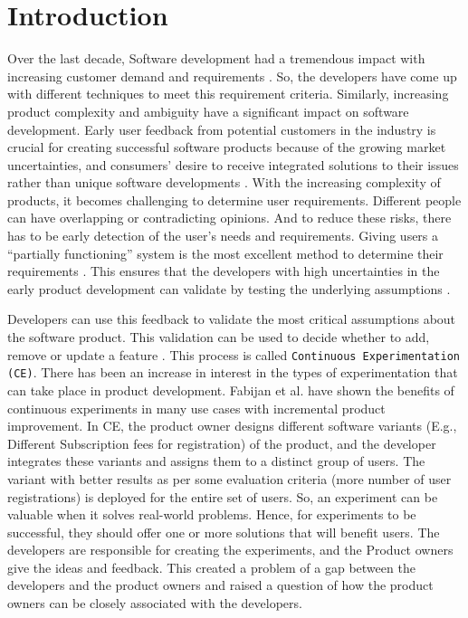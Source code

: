\chapter{Introduction} \label{chap:intro}

Over the last decade, Software development had a tremendous impact with increasing customer demand and requirements \cite{article:swdemand:ahmed}. 
So, the developers have come up with different techniques to meet this requirement criteria. 
Similarly, increasing product complexity and ambiguity have a significant impact on software development. 
Early user feedback from potential customers in the industry is crucial for creating successful software products because of the growing market uncertainties, and consumers' desire to receive integrated solutions to their issues rather than unique software developments \cite{misc:businessmodels:teece}.
With the increasing complexity of products, it becomes challenging to determine user requirements.
Different people can have overlapping or contradicting opinions. 
And to reduce these risks, there has to be early detection of the user's needs and requirements. 
Giving users a ``partially functioning'' system is the most excellent method to determine their requirements \cite{journal:prototyping:davis}.
This ensures that the developers with high uncertainties in the early product development can validate by testing the underlying assumptions \cite{misc:lean:steve}.

Developers can use this feedback to validate the most critical assumptions about the software product. 
This validation can be used to decide whether to add, remove or update a feature \cite{article:experiments:lindgren}. 
This process is called \texttt{Continuous Experimentation (CE)}.
There has been an increase in interest in the types of experimentation that can take place in product development. 
Fabijan et al. \cite{paper:controlled: experiments} have shown the benefits of continuous experiments in many use cases with incremental product improvement. 
In CE, the product owner designs different software variants (E.g., Different Subscription fees for registration) of the product, and the developer integrates these variants and assigns them to a distinct group of users. The variant with better results as per some evaluation criteria (more number of user registrations) is deployed for the entire set of users.
So, an experiment can be valuable when it solves real-world problems.
Hence, for experiments to be successful, they should offer one or more solutions that will benefit users.
The developers are responsible for creating the experiments, and the Product owners give the ideas and feedback. 
This created a problem of a gap between the developers and the product owners and raised a question of how the product owners can be closely associated with the developers.

